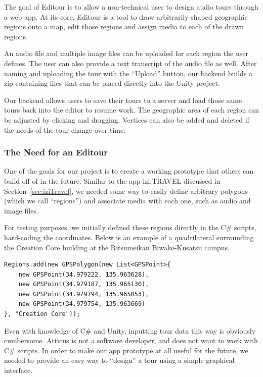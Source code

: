 \documentclass[a4paper, 10pt, american, titlepage]{article}
\begin{document}
The goal of Editour is to allow a non-technical user to design audio tours
through a web app. At its core, Editour is a tool to draw arbitrarily-shaped
geographic regions onto a map, edit those regions and assign media to each of
the drawn regions.

An audio file and multiple image files can be uploaded for each region the user
defines. The user can also provide a text transcript of the audio file as well.
After naming and uploading the tour with the ``Upload'' button, our backend
builds a zip containing files that can be placed directly into the Unity
project.

Our backend allows users to save their tours to a server and load those same
tours back into the editor to resume work. The geographic area of each region
can be adjusted by clicking and dragging. Vertices can also be added and
deleted if the needs of the tour change over time.

\subsubsection{The Need for an Editour}
\label{sec:theNeedForAnEditour}

One of the goals for our project is to create a working prototype that others
can build off of in the future. Similar to the app izi.TRAVEL discussed in
Section~\ref{sec:iziTravel}, we needed some way to easily define arbitrary
polygons (which we call ``regions'') and associate media with each one, such as
audio and image files.

For testing purposes, we initially defined these regions directly in the C\#
scripts, hard-coding the coordinates. Below is an example of a quadrilateral
surrounding the Creation Core building at the Ritsumeikan Biwako-Kusatsu campus.

\begin{verbatim}
Regions.add(new GPSPolygon(new List<GPSPoint>{
    new GPSPoint(34.979222, 135.963628),
    new GPSPoint(34.979187, 135.965130),
    new GPSPoint(34.979794, 135.965053),
    new GPSPoint(34.979754, 135.963669)
}, "Creation Core"));
\end{verbatim}

Even with knowledge of C\# and Unity, inputting tour data this way is obviously
cumbersome. Atticus is not a software developer, and does not want to work with
C\# scripts. In order to make our app prototype at all useful for the future,
we needed to provide an easy way to ``design'' a tour using a simple graphical
interface.
\end{document}
